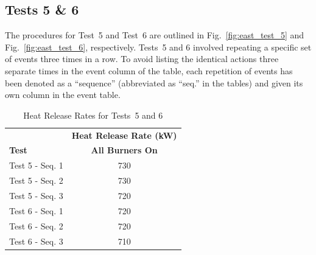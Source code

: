 \documentclass[12pt,oneside]{book}
\begin{document}
\subsection{Tests 5 \& 6}
The procedures for Test~5 and Test~6 are outlined in Fig.~\ref{fig:east_test_5} and Fig.~\ref{fig:east_test_6}, respectively. Tests~5 and 6 involved repeating a specific set of events three times in a row. To avoid listing the identical actions three separate times in the event column of the table, each repetition of events has been denoted as a ``sequence'' (abbreviated as ``seq.'' in the tables) and given its own column in the event table. 

\begin{table}[!ht]
\caption{Heat Release Rates for Tests~5 and 6}
\begin{tabular}{lc}
 \toprule
 & \textbf{Heat Release Rate (kW)} \\
\textbf{Test} & \textbf{All Burners On} \\
\midrule
Test 5 - Seq. 1		& 730 \\
Test 5 - Seq. 2		& 730 \\
Test 5 - Seq. 3		& 720 \\
Test 6 - Seq. 1		& 720 \\
Test 6 - Seq. 2		& 720 \\
Test 6 - Seq. 3		& 710 \\
\bottomrule
\end{tabular}
\label{table:HRR_Tests_5-6}
\end{table}
\end{document}
